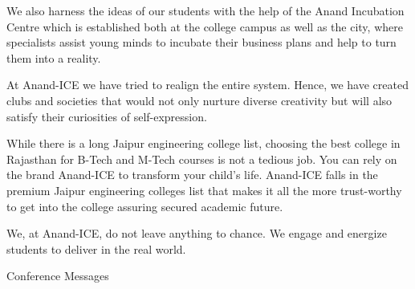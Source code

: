 \documentclass[twoside,11pt]{amsart}
\begin{document}
We also harness the ideas of our students with the help of the Anand Incubation Centre which is established both at the college campus as well as the city, where specialists assist young minds to incubate their business plans and help to turn them into a reality.

At Anand-ICE we have tried to realign the entire system. Hence, we have created clubs and societies that would not only nurture diverse creativity but will also satisfy their curiosities of self-expression.

While there is a long Jaipur engineering college list, choosing the best college in Rajasthan for B-Tech and M-Tech courses is not a tedious job. You can rely on the brand Anand-ICE to transform your child’s life. Anand-ICE falls in the premium Jaipur engineering colleges list that makes it all the more trust-worthy to get into the college assuring secured academic future.

We, at Anand-ICE, do not leave anything to chance. We engage and energize students to deliver in the real world.


\newpage
\vspace*{85mm}

{\Huge
\begin{center}
Conference Messages
\end{center}
}
\end{document}

